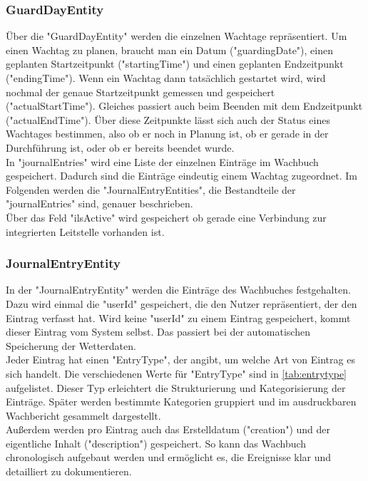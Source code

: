 \documentclass[fontsize=12pt,openright,oneside,paper=a4,BCOR=1cm]{scrbook}
\begin{document}
\subsubsection{GuardDayEntity}
Über die "GuardDayEntity" werden die einzelnen Wachtage repräsentiert. Um einen Wachtag zu planen, braucht man ein Datum ("guardingDate"), einen geplanten Startzeitpunkt ("startingTime") und einen geplanten Endzeitpunkt ("endingTime"). Wenn ein Wachtag dann tatsächlich gestartet wird, wird nochmal der genaue Startzeitpunkt gemessen und gespeichert ("actualStartTime"). Gleiches passiert auch beim Beenden mit dem Endzeitpunkt ("actualEndTime"). Über diese Zeitpunkte lässt sich auch der Status eines Wachtages bestimmen, also ob er noch in Planung ist, ob er gerade in der Durchführung ist, oder ob er bereits beendet wurde. \\ 
In "journalEntries" wird eine Liste der einzelnen Einträge im Wachbuch gespeichert. Dadurch sind die Einträge eindeutig einem Wachtag zugeordnet. Im Folgenden werden die "JournalEntryEntities", die Bestandteile der "journalEntries" sind, genauer beschrieben. \\
Über das Feld "ilsActive" wird gespeichert ob gerade eine Verbindung zur integrierten Leitstelle vorhanden ist.  
 
 \subsubsection{JournalEntryEntity}
In der "JournalEntryEntity" werden die Einträge des Wachbuches festgehalten. Dazu wird einmal die "userId" gespeichert, die den Nutzer repräsentiert, der den Eintrag verfasst hat. Wird keine "userId" zu einem Eintrag gespeichert, kommt dieser Eintrag vom System selbst. Das passiert bei der automatischen Speicherung der Wetterdaten. \\
Jeder Eintrag hat einen "EntryType", der angibt, um welche Art von Eintrag es sich handelt. Die verschiedenen Werte für "EntryType" sind in \ref{tab:entrytype} aufgelistet. Dieser Typ erleichtert die Strukturierung und Kategorisierung der Einträge. Später werden bestimmte Kategorien gruppiert und im ausdruckbaren Wachbericht gesammelt dargestellt. \\
Außerdem werden pro Eintrag auch das Erstelldatum ("creation") und der eigentliche Inhalt ("description") gespeichert. So kann das Wachbuch chronologisch aufgebaut werden und ermöglicht es, die Ereignisse klar und detailliert zu dokumentieren.
\end{document}
